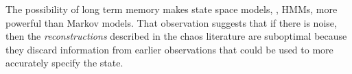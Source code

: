 The possibility of long term memory makes state space models, \eg,
HMMs, more powerful than Markov models.  That observation suggests
that if there is noise, then the \emph{ reconstructions}
described in the chaos
literature\cite{Packard80,Takens81,Fraser86,Sauer91} are suboptimal
because they discard information from earlier observations that could
be used to more accurately specify the state.


\begin{CVSID}
\end{CVSID}

